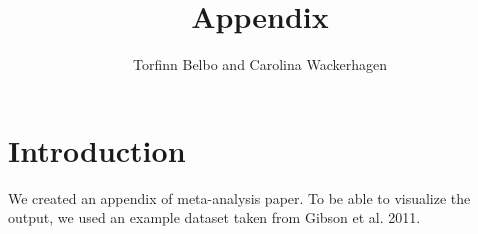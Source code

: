 \documentclass[11pt, a4paper]{article} %
\begin{document}



\title{Appendix}

\author{Torfinn Belbo and Carolina Wackerhagen}

\maketitle



\section{Introduction}%

We created an appendix of meta-analysis paper. To be able to visualize the output, we used an example dataset taken from Gibson et al. 2011.


\end{document}
